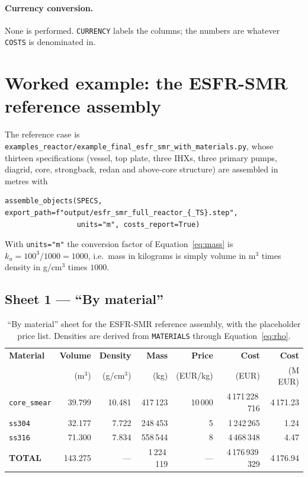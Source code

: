 \documentclass[9pt,a4paper]{extarticle}
\newcommand{\code}[1]{\texttt{\small #1}}
\newcommand{\file}[1]{\texttt{\small #1}}
\begin{document}
\paragraph{Currency conversion.} None is performed. \code{CURRENCY} labels the
columns; the numbers are whatever \code{COSTS} is denominated in.

\section{Worked example: the ESFR-SMR reference assembly}
\label{sec:worked}

The reference case is \file{examples\_reactor/example\_final\_esfr\_smr\_with\_materials.py},
whose thirteen specifications (vessel, top plate, three IHXs, three primary
pumps, diagrid, core, strongback, redan and above-core structure) are assembled
in metres with

\begin{lstlisting}[style=py]
assemble_objects(SPECS, export_path=f"output/esfr_smr_full_reactor_{_TS}.step",
                 units="m", costs_report=True)
\end{lstlisting}

With \code{units="m"} the conversion factor of Equation~\eqref{eq:mass} is
$k_u = 100^3/1000 = 1000$, i.e.\ mass in kilograms is simply volume in m$^3$
times density in g/cm$^3$ times $1000$.

\subsection{Sheet 1 --- ``By material''}

\begin{table}[h]
\centering
\footnotesize
\begin{tabular}{@{}lrrrrrr@{}}
\toprule
\textbf{Material} & \textbf{Volume} & \textbf{Density} & \textbf{Mass} &
\textbf{Price} & \textbf{Cost} & \textbf{Cost} \\
 & (m$^3$) & (g/cm$^3$) & (kg) & (EUR/kg) & (EUR) & (M EUR) \\
\midrule
\code{core\_smear}   &  39.799 & 10.481 &   417\,123 & 10\,000 & 4\,171\,228\,716 & 4\,171.23 \\
\code{ss304}         &  32.177 &  7.722 &   248\,453 &       5 &      1\,242\,265 &     1.24 \\
\code{ss316}         &  71.300 &  7.834 &   558\,544 &       8 &      4\,468\,348 &     4.47 \\
\midrule
\textbf{TOTAL}       & 143.275 &  ---   & 1\,224\,119 &   ---   & 4\,176\,939\,329 & 4\,176.94 \\
\bottomrule
\end{tabular}
\caption{``By material'' sheet for the ESFR-SMR reference assembly, with the
placeholder price list. Densities are derived from \code{MATERIALS} through
Equation~\eqref{eq:rho}.}
\label{tab:bymaterial}
\end{table}
\end{document}
